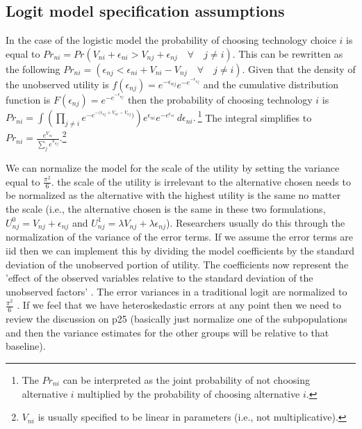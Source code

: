 \documentclass[10pt]{amsart}
\begin{document}
\subsection{Logit model specification assumptions}
In the case of the logistic model the probability of choosing technology choice $i$ is equal to $Pr_{ni} = Pr(V_{ni} + \epsilon_{ni} > V_{nj} + \epsilon_{nj} \quad \forall \quad j \neq i)$. 
This can be rewritten as the following $Pr_{ni} = (\epsilon_{nj} <  \epsilon_{ni} + V_{ni} - V_{nj} \quad \forall \quad j \neq i)$.
Given that the density of the unobserved utility is $f(\epsilon_{nj}) = e^{-\epsilon_{nj}}e^{-e^{-\epsilon_{nj}}}$ and the cumulative distribution function is $F(\epsilon_{nj}) = e^{-e^{-\epsilon_{nj}}}$ then the probability of choosing technology $i$ is $Pr_{ni} = \int \left(\prod_{j \neq i} e^{-e^{-(\epsilon_{nj} + V_{ni} - V_{nj}})}\right)e^{\epsilon_{ni}}e^{-e^{\epsilon_{ni}}} \,d\epsilon_{ni}.\ $\footnote{The $Pr_{ni}$ can be interpreted as the joint probability of not choosing alternative $i$ multiplied by the probability of choosing alternative $i$.} 
The integral simplifies to $Pr_{ni} = \frac{e^{V_{ni}}}{\sum_{j} e^{V_{nj}}}$.\footnote{$V_{ni}$ is usually specified to be linear in parameters (i.e., not multiplicative).}

We can normalize the model for the scale of the utility by setting the variance equal to $\frac{\pi^2}{6}$. 
the scale of the utility is irrelevant to the alternative chosen  needs to be normalized as the alternative with the highest utility is the same no matter the scale (i.e., the alternative chosen is the same in these two formulations, $U^0_{nj} = V_{nj} + \epsilon_{nj}$ and $U^1_{nj} = \lambda V_{nj} + \lambda \epsilon_{nj}$).
Researchers usually do this through the normalization of the variance of the error terms. 
If we assume the error terms are iid then we can implement this by dividing the model coefficients by the standard deviation of the unobserved portion of utility.
The coefficients now represent the 'effect of the observed variables relative to the standard deviation of the unobserved factors' \parencite[24]{train:2009aa}.  
The error variances in a traditional logit are normalized to $\frac{\pi^2}{6}$ \parencite{train:2009aa}. 
If we feel that we have heteroskedastic errors at any point then we need to review the discussion on p25 (basically just normalize one of the subpopulations and then the variance estimates for the other groups will be relative to that baseline). 
\end{document}
